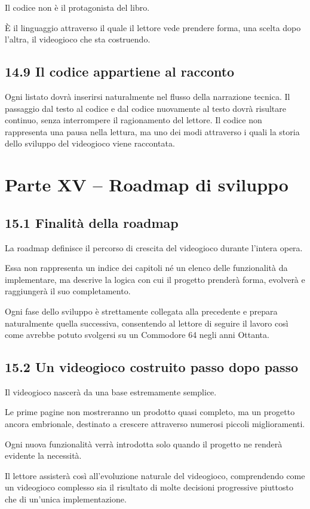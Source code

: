 \documentclass{article}
\begin{document}
Il codice non è il protagonista del libro.

È il linguaggio attraverso il quale il lettore vede prendere forma, una scelta dopo l'altra, il videogioco che sta
costruendo.

\subsection{14.9 Il codice appartiene al racconto}
Ogni listato dovrà inserirsi naturalmente nel flusso della narrazione tecnica. Il passaggio dal testo al codice e dal
codice nuovamente al testo dovrà risultare continuo, senza interrompere il ragionamento del lettore. Il codice non
rappresenta una pausa nella lettura, ma uno dei modi attraverso i quali la storia dello sviluppo del videogioco viene
raccontata.

\section{Parte XV – Roadmap di sviluppo}
\subsection{15.1 Finalità della roadmap}
La roadmap definisce il percorso di crescita del videogioco durante l'intera opera.

Essa non rappresenta un indice dei capitoli né un elenco delle funzionalità da implementare, ma descrive la logica con
cui il progetto prenderà forma, evolverà e raggiungerà il suo completamento.

Ogni fase dello sviluppo è strettamente collegata alla precedente e prepara naturalmente quella successiva, consentendo
al lettore di seguire il lavoro così come avrebbe potuto svolgersi su un Commodore 64 negli anni Ottanta.

\subsection{15.2 Un videogioco costruito passo dopo passo}
Il videogioco nascerà da una base estremamente semplice.

Le prime pagine non mostreranno un prodotto quasi completo, ma un progetto ancora embrionale, destinato a crescere
attraverso numerosi piccoli miglioramenti.

Ogni nuova funzionalità verrà introdotta solo quando il progetto ne renderà evidente la necessità.

Il lettore assisterà così all'evoluzione naturale del videogioco, comprendendo come un videogioco complesso sia il
risultato di molte decisioni progressive piuttosto che di un'unica implementazione.
\end{document}
